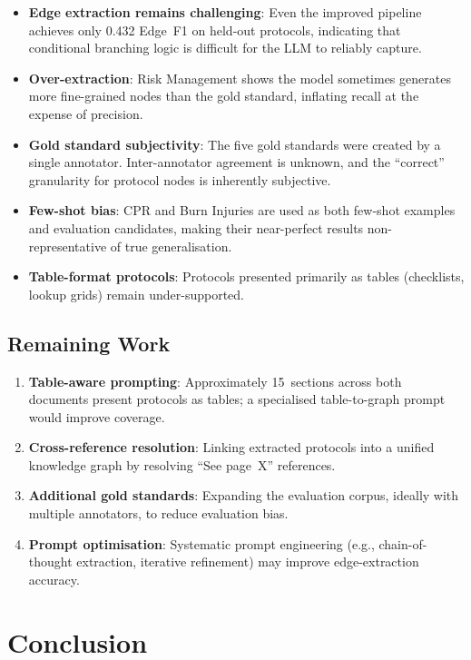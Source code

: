 \documentclass[12pt,a4paper]{article}
\begin{document}
\begin{itemize}[leftmargin=2em]
    \item \textbf{Edge extraction remains challenging}: Even the improved pipeline achieves only 0.432 Edge~F1 on held-out protocols, indicating that conditional branching logic is difficult for the LLM to reliably capture.
    \item \textbf{Over-extraction}: Risk Management shows the model sometimes generates more fine-grained nodes than the gold standard, inflating recall at the expense of precision.
    \item \textbf{Gold standard subjectivity}: The five gold standards were created by a single annotator. Inter-annotator agreement is unknown, and the ``correct'' granularity for protocol nodes is inherently subjective.
    \item \textbf{Few-shot bias}: CPR and Burn Injuries are used as both few-shot examples and evaluation candidates, making their near-perfect results non-representative of true generalisation.
    \item \textbf{Table-format protocols}: Protocols presented primarily as tables (checklists, lookup grids) remain under-supported.
\end{itemize}

\subsection{Remaining Work}

\begin{enumerate}[leftmargin=2em]
    \item \textbf{Table-aware prompting}: Approximately 15~sections across both documents present protocols as tables; a specialised table-to-graph prompt would improve coverage.
    \item \textbf{Cross-reference resolution}: Linking extracted protocols into a unified knowledge graph by resolving ``See page~X'' references.
    \item \textbf{Additional gold standards}: Expanding the evaluation corpus, ideally with multiple annotators, to reduce evaluation bias.
    \item \textbf{Prompt optimisation}: Systematic prompt engineering (e.g., chain-of-thought extraction, iterative refinement) may improve edge-extraction accuracy.
\end{enumerate}

\section{Conclusion}
\label{sec:conclusion}
\end{document}
